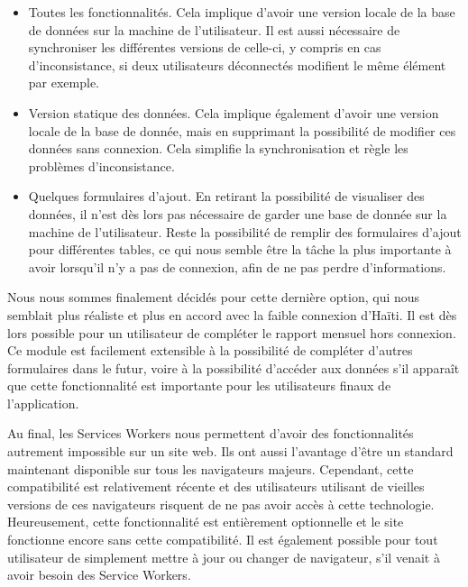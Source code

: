 \documentclass{EPL-master-thesis-covers-FR}
\begin{document}
				\begin{itemize}
					\item Toutes les fonctionnalités. Cela implique d'avoir une version locale de la base de données sur la machine de l'utilisateur. Il est aussi nécessaire de synchroniser les différentes versions de celle-ci, y compris en cas d'inconsistance, si deux utilisateurs déconnectés modifient le même élément par exemple.
					\item Version statique des données. Cela implique également d'avoir une version locale de la base de donnée, mais en supprimant la possibilité de modifier ces données sans connexion. Cela simplifie la synchronisation et règle les problèmes d'inconsistance.
					\item Quelques formulaires d'ajout. En retirant la possibilité de visualiser des données, il n'est dès lors pas nécessaire de garder une base de donnée sur la machine de l'utilisateur. Reste la possibilité de remplir des formulaires d'ajout pour différentes tables, ce qui nous semble être la tâche la plus importante à avoir lorsqu'il n'y a pas de connexion, afin de ne pas perdre d'informations.
				\end{itemize}

				Nous nous sommes finalement décidés pour cette dernière option, qui nous semblait plus réaliste et plus en accord avec la faible connexion d'Haïti. Il est dès lors possible pour un utilisateur de compléter le rapport mensuel hors connexion. Ce module est facilement extensible à la possibilité de compléter d'autres formulaires dans le futur, voire à la possibilité d'accéder aux données s'il apparaît que cette fonctionnalité est importante pour les utilisateurs finaux de l'application.

				Au final, les Services Workers nous permettent d'avoir des fonctionnalités autrement impossible sur un site web. Ils ont aussi l'avantage d'être un standard maintenant disponible sur tous les navigateurs majeurs. Cependant, cette compatibilité est relativement récente et des utilisateurs utilisant de vieilles versions de ces navigateurs risquent de ne pas avoir accès à cette technologie. Heureusement, cette fonctionnalité est entièrement optionnelle et le site fonctionne encore sans cette compatibilité. Il est également possible pour tout utilisateur de simplement mettre à jour ou changer de navigateur, s'il venait à avoir besoin des Service Workers.

\end{document}
